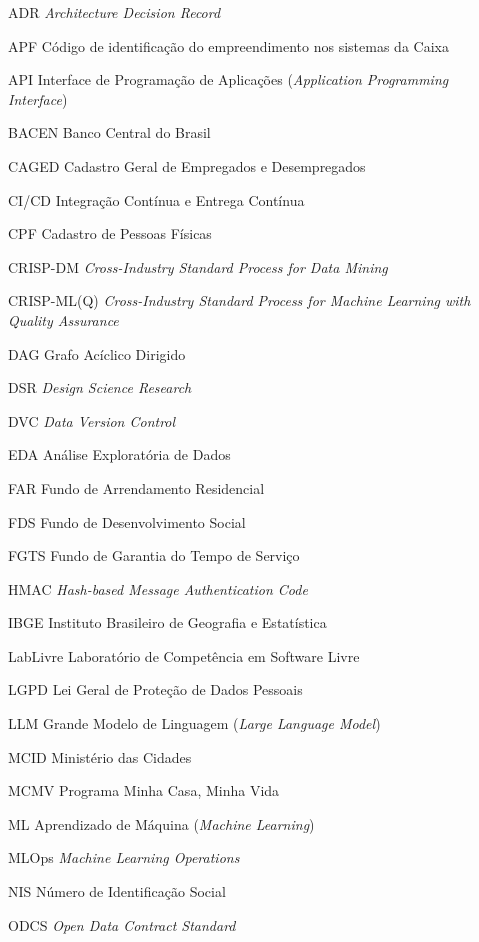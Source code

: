 \begin{siglas}
  \item[ADR] \textit{Architecture Decision Record}
  \item[APF] Código de identificação do empreendimento nos sistemas da Caixa
  \item[API] Interface de Programação de Aplicações (\textit{Application Programming Interface})
  \item[BACEN] Banco Central do Brasil
  \item[CAGED] Cadastro Geral de Empregados e Desempregados
  \item[CI/CD] Integração Contínua e Entrega Contínua
  \item[CPF] Cadastro de Pessoas Físicas
  \item[CRISP-DM] \textit{Cross-Industry Standard Process for Data Mining}
  \item[CRISP-ML(Q)] \textit{Cross-Industry Standard Process for Machine Learning with Quality Assurance}
  \item[DAG] Grafo Acíclico Dirigido
  \item[DSR] \textit{Design Science Research}
  \item[DVC] \textit{Data Version Control}
  \item[EDA] Análise Exploratória de Dados
  \item[FAR] Fundo de Arrendamento Residencial
  \item[FDS] Fundo de Desenvolvimento Social
  \item[FGTS] Fundo de Garantia do Tempo de Serviço
  \item[HMAC] \textit{Hash-based Message Authentication Code}
  \item[IBGE] Instituto Brasileiro de Geografia e Estatística
  \item[LabLivre] Laboratório de Competência em Software Livre
  \item[LGPD] Lei Geral de Proteção de Dados Pessoais
  \item[LLM] Grande Modelo de Linguagem (\textit{Large Language Model})
  \item[MCID] Ministério das Cidades
  \item[MCMV] Programa Minha Casa, Minha Vida
  \item[ML] Aprendizado de Máquina (\textit{Machine Learning})
  \item[MLOps] \textit{Machine Learning Operations}
  \item[NIS] Número de Identificação Social
  \item[ODCS] \textit{Open Data Contract Standard}

\end{siglas}
